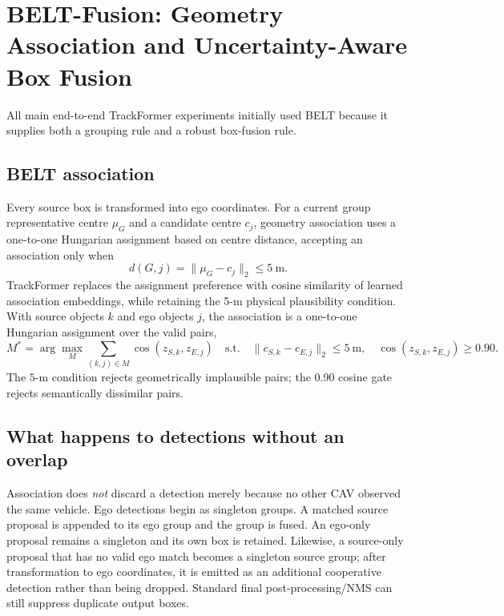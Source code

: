 \documentclass[11pt]{article}
\begin{document}
\section{BELT-Fusion: Geometry Association and Uncertainty-Aware Box Fusion}

All main end-to-end TrackFormer experiments initially used BELT because it supplies both a grouping rule and a robust box-fusion rule.

\subsection{BELT association}

Every source box is transformed into ego coordinates. For a current group representative centre $\mu_G$ and a candidate centre $c_j$, geometry association uses a one-to-one Hungarian assignment based on centre distance, accepting an association only when
\begin{equation}
d(G,j)=\lVert\mu_G-c_j\rVert_2\leq5\ \mathrm{m}.
\end{equation}
TrackFormer replaces the assignment preference with cosine similarity of learned association embeddings, while retaining the 5-m physical plausibility condition.  With source objects $k$ and ego objects $j$, the association is a one-to-one Hungarian assignment over the valid pairs,
\begin{equation}
M^*=\arg\max_M\sum_{(k,j)\in M}\cos(z_{S,k},z_{E,j})
\quad\text{s.t.}\quad\lVert c_{S,k}-c_{E,j}\rVert_2\leq5\ \mathrm{m},\quad \cos(z_{S,k},z_{E,j})\geq0.90.
\end{equation}
The $5$-m condition rejects geometrically implausible pairs; the 0.90 cosine gate rejects semantically dissimilar pairs.

\subsection{What happens to detections without an overlap}

Association does \emph{not} discard a detection merely because no other CAV observed the same vehicle.  Ego detections begin as singleton groups.  A matched source proposal is appended to its ego group and the group is fused.  An ego-only proposal remains a singleton and its own box is retained.  Likewise, a source-only proposal that has no valid ego match becomes a singleton source group; after transformation to ego coordinates, it is emitted as an additional cooperative detection rather than being dropped.  Standard final post-processing/NMS can still suppress duplicate output boxes.
\end{document}
